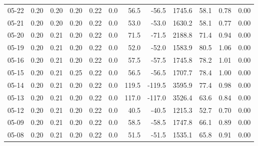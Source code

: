 \begin{threeparttable}
{\begin{tabular}{lrrrrrrrrrrr}
  05-22 &          0.20 &          0.20 &          0.20 &        0.22 &                 0.0 &                56.5 &      -56.5 &              1745.6 &             58.1 &            0.78 &                   0.00 \\
  05-21 &          0.20 &          0.20 &          0.20 &        0.22 &                 0.0 &                53.0 &      -53.0 &              1630.2 &             58.1 &            0.77 &                   0.00 \\
  05-20 &          0.20 &          0.21 &          0.20 &        0.22 &                 0.0 &                71.5 &      -71.5 &              2188.8 &             71.4 &            0.94 &                   0.00 \\
  05-19 &          0.20 &          0.21 &          0.20 &        0.22 &                 0.0 &                52.0 &      -52.0 &              1583.9 &             80.5 &            1.06 &                   0.00 \\
  05-16 &          0.20 &          0.21 &          0.20 &        0.22 &                 0.0 &                57.5 &      -57.5 &              1745.8 &             78.2 &            1.01 &                   0.00 \\
  05-15 &          0.20 &          0.21 &          0.25 &        0.22 &                 0.0 &                56.5 &      -56.5 &              1707.7 &             78.4 &            1.00 &                   0.00 \\
  05-14 &          0.20 &          0.21 &          0.20 &        0.22 &                 0.0 &               119.5 &     -119.5 &              3595.9 &             77.4 &            0.98 &                   0.00 \\
  05-13 &          0.20 &          0.21 &          0.20 &        0.22 &                 0.0 &               117.0 &     -117.0 &              3526.4 &             63.6 &            0.84 &                   0.00 \\
  05-12 &          0.20 &          0.21 &          0.20 &        0.22 &                 0.0 &                40.5 &      -40.5 &              1215.3 &             52.7 &            0.70 &                   0.00 \\
  05-09 &          0.20 &          0.21 &          0.20 &        0.22 &                 0.0 &                58.5 &      -58.5 &              1747.8 &             66.1 &            0.89 &                   0.00 \\
  05-08 &          0.20 &          0.21 &          0.20 &        0.22 &                 0.0 &                51.5 &      -51.5 &              1535.1 &             65.8 &            0.91 &                   0.00 \\

\end{tabular}}
\end{threeparttable}
